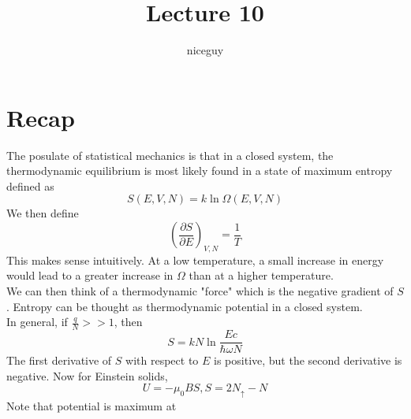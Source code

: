 \documentclass[12pt]{article}
\author{niceguy}
\title{Lecture 10}
\begin{document}
\maketitle

\section{Recap}

The posulate of statistical mechanics is that in a closed system, the thermodynamic equilibrium is most likely found in a state of maximum entropy defined as
$$S(E,V,N) = k\ln\Omega(E,V,N)$$
We then define
$$\left(\frac{\partial S}{\partial E}\right)_{V,N} = \frac{1}{T}$$
This makes sense intuitively. At a low temperature, a small increase in energy would lead to a greater increase in $\Omega$ than at a higher temperature. \\
We can then think of a thermodynamic "force" which is the negative gradient of $S$. Entropy can be thought as thermodynamic potential in a closed system. \\
In general, if $\frac{q}{N} >> 1$, then
$$S = kN\ln\frac{Ec}{\hbar\omega N}$$
The first derivative of $S$ with respect to $E$ is positive, but the second derivative is negative.
Now for Einstein solids,
$$U = -\mu_0BS, S = 2N_\uparrow - N$$
Note that potential is maximum at 
\end{document}
